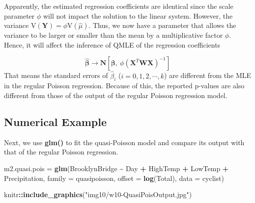 \documentclass[
]{book}
\newenvironment{Shaded}{\begin{snugshade}}{\end{snugshade}}
\newcommand{\AttributeTok}[1]{\textcolor[rgb]{0.13,0.29,0.53}{#1}}
\newcommand{\FunctionTok}[1]{\textcolor[rgb]{0.13,0.29,0.53}{\textbf{#1}}}
\newcommand{\NormalTok}[1]{#1}
\newcommand{\OtherTok}[1]{\textcolor[rgb]{0.56,0.35,0.01}{#1}}
\newcommand{\SpecialCharTok}[1]{\textcolor[rgb]{0.81,0.36,0.00}{\textbf{#1}}}
\newcommand{\StringTok}[1]{\textcolor[rgb]{0.31,0.60,0.02}{#1}}
\begin{document}
Apparently, the estimated regression coefficients are identical since the scale parameter \(\phi\) will not impact the solution to the linear system. However, the variance \(\text{V}(\mathbf{Y}) = \phi \text{V}(\hat{\mu})\). Thus, we now have a parameter that allows the variance to be larger or smaller than the mean by a multiplicative factor \(\phi\). Hence, it will affect the inference of QMLE of the regression coefficients

\[
\hat{\mathbf{\beta}} \to \mathbf{N}[\mathbf{\beta},~ \phi(\mathbf{X}^T\mathbf{WX})^{-1}]
\]
That means the standard errors of \(\hat{\beta}_i\) (\(i = 0,1, 2, \cdots, k\)) are different from the MLE in the regular Poisson regression. Because of this, the reported p-values are also different from those of the output of the regular Poisson regression model.

\hfill\break

\hypertarget{numerical-example-1}{%
\subsection{Numerical Example}\label{numerical-example-1}}

Next, we use \textbf{glm()} to fit the quasi-Poisson model and compare its output with that of the regular Poisson regression.

\begin{Shaded}
\begin{Highlighting}[]
\NormalTok{m2.quasi.pois }\OtherTok{=} \FunctionTok{glm}\NormalTok{(BrooklynBridge }\SpecialCharTok{\textasciitilde{}}\NormalTok{ Day }\SpecialCharTok{+}\NormalTok{ HighTemp }\SpecialCharTok{+}\NormalTok{ LowTemp }\SpecialCharTok{+}\NormalTok{ Precipitation, }
                    \AttributeTok{family =}\NormalTok{ quasipoisson, }\AttributeTok{offset =} \FunctionTok{log}\NormalTok{(Total),  }\AttributeTok{data =}\NormalTok{ cyclist)}
\end{Highlighting}
\end{Shaded}

\begin{Shaded}
\begin{Highlighting}[]
\NormalTok{knitr}\SpecialCharTok{::}\FunctionTok{include\_graphics}\NormalTok{(}\StringTok{"img10/w10{-}QuasiPoisOutput.jpg"}\NormalTok{)}
\end{Highlighting}
\end{Shaded}
\end{document}
